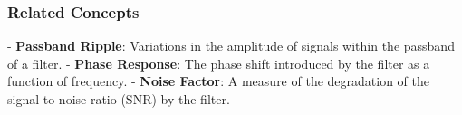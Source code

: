 \subsubsection*{Related Concepts}
- \textbf{Passband Ripple}: Variations in the amplitude of signals within the passband of a filter.
- \textbf{Phase Response}: The phase shift introduced by the filter as a function of frequency.
- \textbf{Noise Factor}: A measure of the degradation of the signal-to-noise ratio (SNR) by the filter.

